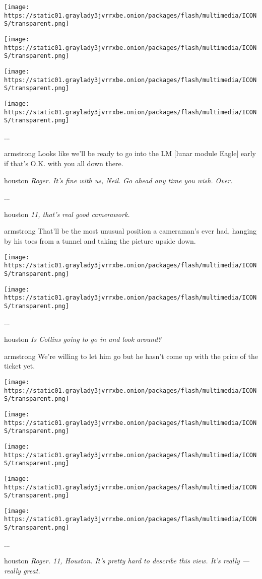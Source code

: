 \texttt{[image: https://static01.graylady3jvrrxbe.onion/packages/flash/multimedia/ICONS/transparent.png]}

\texttt{[image: https://static01.graylady3jvrrxbe.onion/packages/flash/multimedia/ICONS/transparent.png]}

\texttt{[image: https://static01.graylady3jvrrxbe.onion/packages/flash/multimedia/ICONS/transparent.png]}

\texttt{[image: https://static01.graylady3jvrrxbe.onion/packages/flash/multimedia/ICONS/transparent.png]}

...

armstrong Looks like we'll be ready to go into the LM {[}lunar module
Eagle{]} early if that's O.K. with you all down there.

houston \emph{Roger. It's fine with us, Neil. Go ahead any time you
wish. Over.}

...

houston \emph{11, that's real good camerawork.}

armstrong That'll be the most unusual position a cameraman's ever had,
hanging by his toes from a tunnel and taking the picture upside down.

\texttt{[image: https://static01.graylady3jvrrxbe.onion/packages/flash/multimedia/ICONS/transparent.png]}

\texttt{[image: https://static01.graylady3jvrrxbe.onion/packages/flash/multimedia/ICONS/transparent.png]}

...

houston \emph{Is Collins going to go in and look around?}

armstrong We're willing to let him go but he hasn't come up with the
price of the ticket yet.

\texttt{[image: https://static01.graylady3jvrrxbe.onion/packages/flash/multimedia/ICONS/transparent.png]}

\texttt{[image: https://static01.graylady3jvrrxbe.onion/packages/flash/multimedia/ICONS/transparent.png]}

\texttt{[image: https://static01.graylady3jvrrxbe.onion/packages/flash/multimedia/ICONS/transparent.png]}

\texttt{[image: https://static01.graylady3jvrrxbe.onion/packages/flash/multimedia/ICONS/transparent.png]}

\texttt{[image: https://static01.graylady3jvrrxbe.onion/packages/flash/multimedia/ICONS/transparent.png]}

...

houston \emph{Roger. 11, Houston. It's pretty hard to describe this
view. It's really --- really great.}

